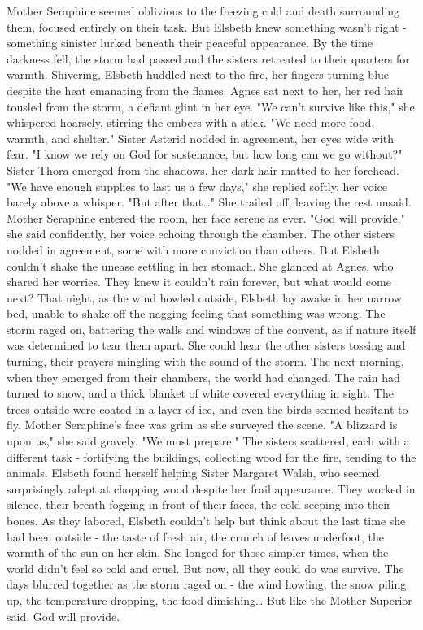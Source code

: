 \documentclass[11pt]{article}
\begin{document}
Mother Seraphine seemed oblivious to the freezing cold and death surrounding them, focused entirely on their task. But Elsbeth knew something wasn't right - something sinister lurked beneath their peaceful appearance.
By the time darkness fell, the storm had passed and the sisters retreated to their quarters for warmth. Shivering, Elsbeth huddled next to the fire, her fingers turning blue despite the heat emanating from the flames. Agnes sat next to her, her red hair tousled from the storm, a defiant glint in her eye.
"We can't survive like this," she whispered hoarsely, stirring the embers with a stick. "We need more food, warmth, and shelter."
Sister Asterid nodded in agreement, her eyes wide with fear. "I know we rely on God for sustenance, but how long can we go without?"
Sister Thora emerged from the shadows, her dark hair matted to her forehead. "We have enough supplies to last us a few days," she replied softly, her voice barely above a whisper. "But after that\ldots{}" She trailed off, leaving the rest unsaid.
Mother Seraphine entered the room, her face serene as ever. "God will provide," she said confidently, her voice echoing through the chamber. The other sisters nodded in agreement, some with more conviction than others.
But Elsbeth couldn't shake the unease settling in her stomach. She glanced at Agnes, who shared her worries. They knew it couldn't rain forever, but what would come next?
That night, as the wind howled outside, Elsbeth lay awake in her narrow bed, unable to shake off the nagging feeling that something was wrong. The storm raged on, battering the walls and windows of the convent, as if nature itself was determined to tear them apart. She could hear the other sisters tossing and turning, their prayers mingling with the sound of the storm.
The next morning, when they emerged from their chambers, the world had changed. The rain had turned to snow, and a thick blanket of white covered everything in sight. The trees outside were coated in a layer of ice, and even the birds seemed hesitant to fly. Mother Seraphine's face was grim as she surveyed the scene.
"A blizzard is upon us," she said gravely. "We must prepare."
The sisters scattered, each with a different task - fortifying the buildings, collecting wood for the fire, tending to the animals. Elsbeth found herself helping Sister Margaret Walsh, who seemed surprisingly adept at chopping wood despite her frail appearance. They worked in silence, their breath fogging in front of their faces, the cold seeping into their bones.
As they labored, Elsbeth couldn't help but think about the last time she had been outside - the taste of fresh air, the crunch of leaves underfoot, the warmth of the sun on her skin. She longed for those simpler times, when the world didn't feel so cold and cruel. But now, all they could do was survive.
The days blurred together as the storm raged on - the wind howling, the snow piling up, the temperature dropping, the food dimishing\ldots{} But like the Mother Superior said, God will provide.
\end{document}
